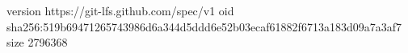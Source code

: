 version https://git-lfs.github.com/spec/v1
oid sha256:519b69471265743986d6a344d5ddd6e52b03ecaf61882f6713a183d09a7a3af7
size 2796368
